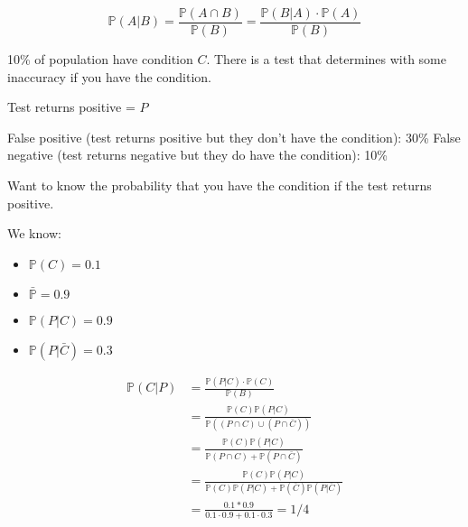 \documentclass[main.tex]{subfiles}
\begin{document}
\begin{equation}
\label{eq:bayes}
\mathbb{P}(A | B) = \frac{\mathbb{P}(A\cap B)}{\mathbb{P}(B)} = \frac{\mathbb{P}(B | A) \cdot \mathbb{P}(A)}{\mathbb{P}(B)}
\end{equation}

\begin{exmp}
10\% of population have condition $C$. There is a test that determines with some inaccuracy if you have the condition.

Test returns positive = $P$

False positive (test returns positive but they don't have the condition): 30\%
False negative (test returns negative but they do have the condition): 10\%

Want to know the probability that you have the condition if the test returns positive.

We know:

\begin{itemize}
    \item $\mathbb{P}(C) = 0.1$
    \item $\mathbb{\bar{P}} = 0.9$
    \item $\mathbb{P}(P | C) = 0.9$
    \item $\mathbb{P}(P | \bar{C}) = 0.3$
\end{itemize}

\begin{align}
\mathbb{P}(C | P) &= \frac{\mathbb{P}(P | C)\cdot\mathbb{P}(C)}{\mathbb{P}(B)}\\
                  &= \frac{\mathbb{P}(C)\mathbb{P}(P | C)}{\mathbb{P}((P \cap C) \cup (P \cap \bar{C}))}\\
                  &= \frac{\mathbb{P}(C)\mathbb{P}(P | C)}{\mathbb{P}(P\cap C) + \mathbb{P}(P \cap \bar{C})} \\
                  &= \frac{\mathbb{P}(C)\mathbb{P}(P | C)}{\mathbb{P}(C)\mathbb{P}(P | C) + \mathbb{P}(\bar{C})\mathbb{P}(P | \bar{C})} \\
                  &= \frac{0.1 * 0.9}{0.1 \cdot 0.9 + 0.1 \cdot 0.3} = 1/4
\end{align}
\end{exmp}
\end{document}
